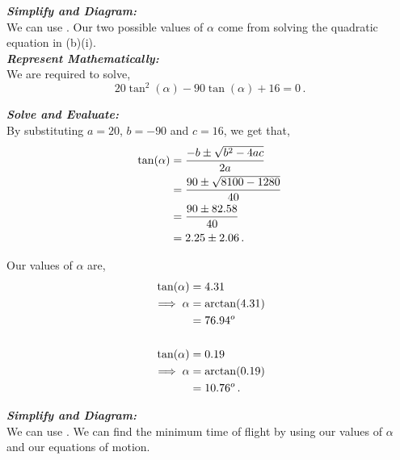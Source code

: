 \begin{subquestions}
\begin{subsubquestions}

\subsubquestion

\textbf{\textit{Simplify and Diagram:}} \\
We can use . Our two possible values of $\alpha$ come from solving the quadratic equation in (b)(i).\\
	
	
	
	
\textbf{\textit{Represent Mathematically:}} \\
We are required to solve,
\begin{equation}
	20\tan^2(\alpha)-90\tan(\alpha)+16 = 0 \,.
\end{equation}
	
	
	
	
\textbf{\textit{Solve and Evaluate:}} \\
By substituting $a=20$, $b=-90$ and $c=16$, we get that,
\begin{align}
	\tan(\alpha) & = \frac{-b \pm \sqrt{b^2-4ac}}{2a} \nonumber \\
	             & = \frac{90 \pm \sqrt{8100-1280}}{40} \nonumber \\
	             & = \frac{90 \pm 82.58}{40} \nonumber \\
	             & = 2.25 \pm 2.06 \,.
\end{align}
	
Our values of $\alpha$ are,
\begin{align}
	\tan(\alpha) & = 4.31 \nonumber \\
	\implies \alpha & = \arctan(4.31) \nonumber \\
	                & = 76.94^o \\ \nonumber \\
	\tan(\alpha) & = 0.19 \nonumber \\
	\implies \alpha & = \arctan(0.19) \nonumber \\
					& = 10.76^o \,.
\end{align}
	

\subsubquestion

\textbf{\textit{Simplify and Diagram:}} \\
We can use . We can find the minimum time of flight by using our values of $\alpha$ and our equations of motion.\\





\end{subsubquestions}
\end{subquestions}
